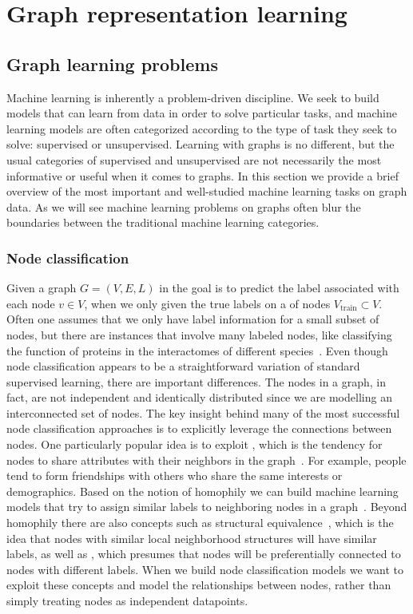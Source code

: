 \chapter{Graph representation learning}\label{grl}

\section{Graph learning problems}
Machine learning is inherently a problem-driven discipline. We seek to build models that can learn from data in order to solve particular tasks, and machine learning models are often categorized according to the type of task they seek to solve: supervised or unsupervised. Learning with graphs is no different, but the usual categories of supervised and unsupervised are not necessarily the most informative or useful when it comes to graphs. In this section we provide a brief overview of the most important and well-studied machine learning tasks on graph data. As we will see machine learning problems on graphs often blur the boundaries between the traditional machine learning categories.

\subsection{Node classification}
Given a graph $G=(V,E,L)$ in  the goal is to predict the label associated with each node $v\in V$, when we only given the true labels on a  of nodes $V_\text{train}\subset V$. Often one assumes that we only have label information for a small subset of nodes, but there are instances that involve many labeled nodes, like classifying the function of proteins in the interactomes of different species~\cite{Hamilton2017inductive}.
Even though node classification appears to be a straightforward variation of standard supervised learning, there are important differences. The nodes in a graph, in fact, are not independent and identically distributed since we are modelling an interconnected set of nodes. The key insight behind many of the most successful node classification approaches is to explicitly leverage the connections between nodes. One particularly popular idea is to exploit , which is the tendency for nodes to share attributes with their neighbors in the graph~\cite{Mcpherson2001homophilyInSocialNw}. For example, people tend to form friendships with others who share the same interests or demographics. Based on the notion of homophily we can build machine learning models that try to assign similar labels to neighboring nodes in a graph~\cite{Zhou2003LearningLocalGlobalConsistency}. Beyond homophily there are also concepts such as structural equivalence~\cite{Donnat2017GraphWaveletsStructuralRoleSimilarityComplexNws}, which is the idea that nodes with similar local neighborhood structures will have similar labels, as well as , which presumes that nodes will be preferentially connected to nodes with different labels. When we build node classification models we want to exploit these concepts and model the relationships between nodes, rather than simply treating nodes as independent datapoints.

